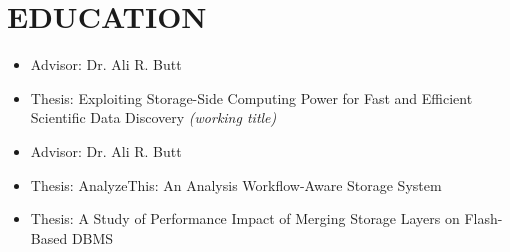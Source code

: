 \section{EDUCATION}

\begin{itemize}
\item {\small Advisor: Dr. Ali R. Butt}
\item {\small Thesis: Exploiting Storage-Side Computing Power for Fast and Efficient Scientific Data Discovery
            {\footnotesize{\it(working title)}}}
\end{itemize}

\begin{itemize}
\item {\small Advisor: Dr. Ali R. Butt}
\item {\small Thesis: AnalyzeThis: An Analysis Workflow-Aware Storage System}
\end{itemize}

\begin{itemize}
\item {\small Thesis: A Study of Performance Impact of Merging Storage Layers on Flash-Based DBMS}
\end{itemize}



